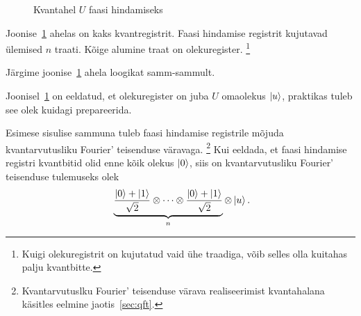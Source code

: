 \documentclass[12pt]{report}
\def\ket#1{\mathinner{|#1\rangle}}
\begin{document}
\begin{figure}[h]
    \centering
    \caption{Kvantahel \(U\) faasi hindamiseks \cite{nielnse+chuang, kaye+laflamme+mosca}}
    \label{fig:pea}
\end{figure}

Joonise~\ref{fig:pea} ahelas on kaks kvantregistrit.
Faasi hindamise registrit kujutavad ülemised \(n\) traati.
Kõige alumine traat on olekuregister.%
\footnote{Kuigi olekuregistrit on kujutatud vaid ühe traadiga, võib selles olla kuitahas palju kvantbitte.}

Järgime joonise~\ref{fig:pea} ahela loogikat samm-sammult.

Joonisel~\ref{fig:pea} on eeldatud, et olekuregister on juba \(U\) omaolekus
\(\ket{u}\), praktikas tuleb see olek kuidagi prepareerida.

Esimese sisulise sammuna tuleb faasi hindamise registrile mõjuda kvantarvutusliku Fourier' teisenduse väravaga.%
\footnote{Kvantarvutuslku Fourier' teisenduse värava realiseerimist kvantahalana käsitles eelmine jaotis~\ref{sec:qft}.}
Kui eeldada, et faasi hindamise registri kvantbitid olid enne kõik olekus \(\ket{0}\), siis on kvantarvutusliku Fourier' teisenduse tulemuseks olek
\begin{align}\label{f:peainit}
    \underbrace{\frac{\ket{0}+\ket{1}}{\sqrt{2}}
    \otimes \cdots
    \otimes \frac{\ket{0}+\ket{1}}{\sqrt{2}}}_n
    \otimes \ket{u} \rlap{.}
\end{align}
\end{document}
